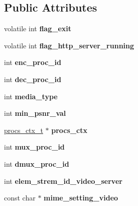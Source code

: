 \subsection*{Public Attributes}
\begin{DoxyCompactItemize}
\item 
volatile int {\bfseries flag\+\_\+exit}\hypertarget{structthr__ctx__s_a83a685c568dc3d48ec393eb30df28bfd}{}\label{structthr__ctx__s_a83a685c568dc3d48ec393eb30df28bfd}

\item 
volatile int {\bfseries flag\+\_\+http\+\_\+server\+\_\+running}\hypertarget{structthr__ctx__s_a3e849c86432962c45ba76944db5985e2}{}\label{structthr__ctx__s_a3e849c86432962c45ba76944db5985e2}

\item 
int {\bfseries enc\+\_\+proc\+\_\+id}\hypertarget{structthr__ctx__s_a6da398b8d64c9c58f889f79f1740a4af}{}\label{structthr__ctx__s_a6da398b8d64c9c58f889f79f1740a4af}

\item 
int {\bfseries dec\+\_\+proc\+\_\+id}\hypertarget{structthr__ctx__s_ad62cec117408d094913b74f592b18d68}{}\label{structthr__ctx__s_ad62cec117408d094913b74f592b18d68}

\item 
int {\bfseries media\+\_\+type}\hypertarget{structthr__ctx__s_a4498448144299bbaf6715a1f9c064348}{}\label{structthr__ctx__s_a4498448144299bbaf6715a1f9c064348}

\item 
int {\bfseries min\+\_\+psnr\+\_\+val}\hypertarget{structthr__ctx__s_abf1ba501f6e422f23216001c2f8147e1}{}\label{structthr__ctx__s_abf1ba501f6e422f23216001c2f8147e1}

\item 
\hyperlink{procs_8c_a9dcafd40720bff127bdc596e9c6dd6cd}{procs\+\_\+ctx\+\_\+t} $\ast$ {\bfseries procs\+\_\+ctx}\hypertarget{structthr__ctx__s_a63bf2f4f3c3c72e624d3930cb2d35218}{}\label{structthr__ctx__s_a63bf2f4f3c3c72e624d3930cb2d35218}

\item 
int {\bfseries mux\+\_\+proc\+\_\+id}\hypertarget{structthr__ctx__s_a6bbe3ad5b641f0634fed8a40383c46e2}{}\label{structthr__ctx__s_a6bbe3ad5b641f0634fed8a40383c46e2}

\item 
int {\bfseries dmux\+\_\+proc\+\_\+id}\hypertarget{structthr__ctx__s_ab480c7f5d488ca514d1e31a8552e44a3}{}\label{structthr__ctx__s_ab480c7f5d488ca514d1e31a8552e44a3}

\item 
int {\bfseries elem\+\_\+strem\+\_\+id\+\_\+video\+\_\+server}\hypertarget{structthr__ctx__s_a122b2245d2794ca5058ff0eec9d06cf0}{}\label{structthr__ctx__s_a122b2245d2794ca5058ff0eec9d06cf0}

\item 
const char $\ast$ {\bfseries mime\+\_\+setting\+\_\+video}\hypertarget{structthr__ctx__s_adbff05b468e16d91553a17a8c0f10954}{}\label{structthr__ctx__s_adbff05b468e16d91553a17a8c0f10954}

\end{DoxyCompactItemize}


